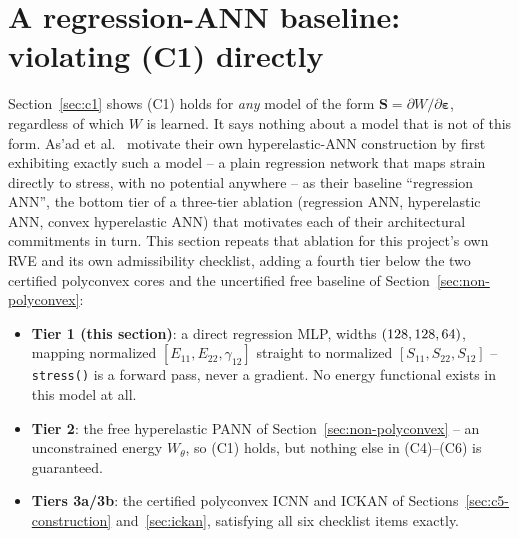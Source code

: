 \documentclass[10pt,a4paper]{article}
\begin{document}
\section{A regression-ANN baseline: violating (C1) directly}
\label{sec:c1-regression}
Section~\ref{sec:c1} shows (C1) holds for \emph{any} model of the form
$\bm S=\partial W/\partial\bm\varepsilon$, regardless of which $W$ is
learned. It says nothing about a model that is not of this form. As'ad et
al.~\cite{Asad2022} motivate their own hyperelastic-ANN construction by
first exhibiting exactly such a model -- a plain regression network that
maps strain directly to stress, with no potential anywhere -- as their
baseline ``regression ANN'', the bottom tier of a three-tier ablation
(regression ANN, hyperelastic ANN, convex hyperelastic ANN) that
motivates each of their architectural commitments in turn. This section
repeats that ablation for this project's own RVE and its own admissibility
checklist, adding a fourth tier below the two certified polyconvex cores
and the uncertified free baseline of Section~\ref{sec:non-polyconvex}:

\begin{itemize}
 \item \textbf{Tier 1 (this section)}: a direct regression MLP, widths
 $(128,128,64{})$, mapping normalized $[E_{11},E_{22},\gamma_{12}]$
 straight to normalized $[S_{11},S_{22},S_{12}]$ -- \texttt{stress()} is a
 forward pass, never a gradient. No energy functional exists in this
 model at all.
 \item \textbf{Tier 2}: the free hyperelastic PANN of
 Section~\ref{sec:non-polyconvex} -- an unconstrained energy $W_\theta$,
 so (C1) holds, but nothing else in (C4)--(C6) is guaranteed.
 \item \textbf{Tiers 3a/3b}: the certified polyconvex ICNN and ICKAN of
 Sections~\ref{sec:c5-construction} and~\ref{sec:ickan}, satisfying all
 six checklist items exactly.
\end{itemize}
\end{document}
